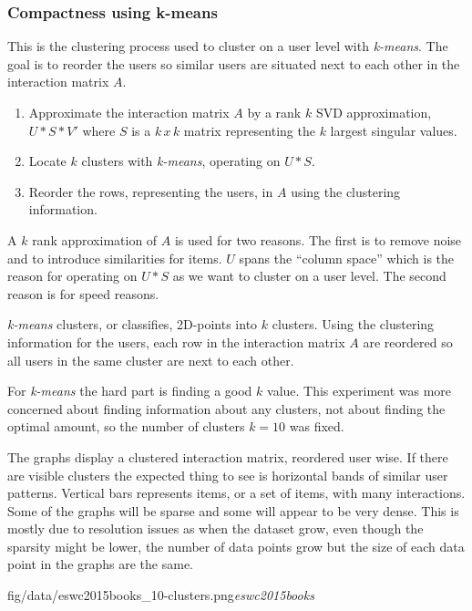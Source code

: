 
\subsubsection{Compactness using k-means}

This is the clustering process used to cluster on a user level with \textit{k-means}. The goal is to reorder the users so similar users are situated next to each other in the interaction matrix $A$.

\begin{enumerate}
    \item Approximate the interaction matrix $A$ by a rank $k$ SVD approximation, $U * S * V'$ where $S$ is a $k\,x\,k$ matrix representing the $k$ largest singular values.
    \item Locate $k$ clusters with \textit{k-means}, operating on $U * S$.
    \item Reorder the rows, representing the users, in $A$ using the clustering information.
\end{enumerate}

A $k$ rank approximation of $A$ is used for two reasons. The first is to remove noise and to introduce similarities for items. $U$ spans the ``column space'' which is the reason for operating on $U * S$ as we want to cluster on a user level. The second reason is for speed reasons.

\textit{k-means} clusters, or classifies, 2D-points into $k$ clusters. Using the clustering information for the users, each row in the interaction matrix $A$ are reordered so all users in the same cluster are next to each other.

For \textit{k-means} the hard part is finding a good $k$ value. This experiment was more concerned about finding information about any clusters, not about finding the optimal amount, so the number of clusters $k = 10$ was fixed.

The graphs display a clustered interaction matrix, reordered user wise.
If there are visible clusters the expected thing to see is horizontal bands of similar user patterns. Vertical bars represents items, or a set of items, with many interactions.  Some of the graphs will be sparse and some will appear to be very dense. This is mostly due to resolution issues as when the dataset grow, even though the sparsity might be lower, the number of data points grow but the size of each data point in the graphs are the same.

\FloatBarrier

{fig/data/eswc2015books_10-clusters.png}{\textit{eswc2015books}}

